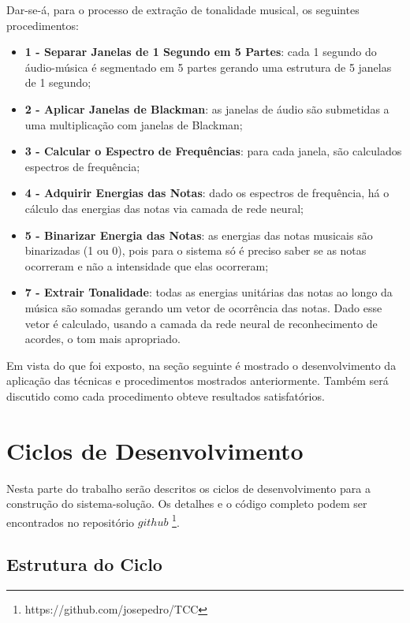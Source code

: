 Dar-se-á, para o processo de extração de tonalidade musical, os seguintes procedimentos:
\begin{itemize}
	\item \textbf{1 - Separar Janelas de 1 Segundo em 5 Partes}: cada 1 segundo do áudio-música é segmentado em 5 partes gerando uma estrutura de 5 janelas de 1 segundo;
	\item \textbf{2 - Aplicar Janelas de Blackman}: as janelas de áudio são submetidas a uma multiplicação com janelas de Blackman;
	\item \textbf{3 - Calcular o Espectro de Frequências}: para cada janela, são calculados espectros de frequência;
	\item \textbf{4 - Adquirir Energias das Notas}: dado os espectros de frequência, há o cálculo das energias das notas via camada de rede neural;
	\item \textbf{5 - Binarizar Energia das Notas}: as energias das notas musicais são binarizadas (1 ou 0), pois para o sistema só é preciso saber se as notas ocorreram e não a intensidade que elas ocorreram;
	\item \textbf{7 - Extrair Tonalidade}: todas as energias unitárias das notas ao longo da música são somadas gerando um vetor de ocorrência das notas. Dado esse vetor é calculado, usando a camada da rede neural de reconhecimento de acordes, o tom mais apropriado.
\end{itemize}

Em vista do que foi exposto, na seção seguinte é mostrado o desenvolvimento da aplicação das técnicas e procedimentos mostrados anteriormente. Também será discutido como cada procedimento obteve resultados satisfatórios. 

\section {Ciclos de Desenvolvimento}
 
Nesta parte do trabalho serão descritos os ciclos de desenvolvimento para a construção do sistema-solução. Os detalhes e o código completo podem ser encontrados no repositório $github$ \footnote{https://github.com/josepedro/TCC}.

\newpage
\subsection{Estrutura do Ciclo}

